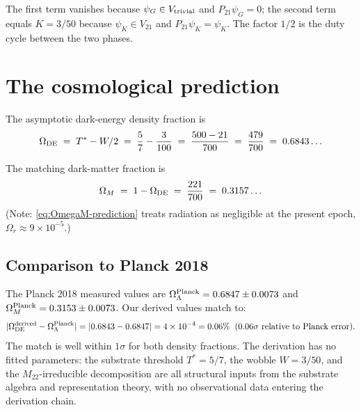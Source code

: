 \documentclass[11pt,reqno]{amsart}
\theoremstyle{plain}
\theoremstyle{definition}
\theoremstyle{remark}
\newcommand{\Mtwentytwo}{M_{22}}
\newcommand{\Vtriv}{V_{\rm trivial}}
\newcommand{\Vtwentyone}{V_{21}}
\newcommand{\Tstar}{T^*}
\newcommand{\Whalf}{W/2}
\newcommand{\OmegaDE}{\Omega_{\rm DE}}
\begin{document}
The first term vanishes because $\psi_G \in \Vtriv$ and $P_{21}\psi_G
= 0$; the second term equals $K = 3/50$ because $\psi_K \in
\Vtwentyone$ and $P_{21}\psi_K = \psi_K$. The factor $1/2$ is the duty
cycle between the two phases.

\section{The cosmological prediction}\label{sec:prediction}


The asymptotic dark-energy density fraction is
\begin{equation}\label{eq:OmegaDE-prediction}
\OmegaDE \;=\; \Tstar - \Whalf \;=\; \frac{5}{7} - \frac{3}{100}
\;=\; \frac{500 - 21}{700} \;=\; \frac{479}{700}
\;=\; 0.6843\ldots
\end{equation}

The matching dark-matter fraction is
\begin{equation}\label{eq:OmegaM-prediction}
\Omega_M \;=\; 1 - \OmegaDE \;=\; \frac{221}{700} \;=\; 0.3157\ldots
\end{equation}
(Note: \eqref{eq:OmegaM-prediction} treats radiation as negligible at
the present epoch, $\Omega_r \approx 9 \times 10^{-5}$.)

\subsection{Comparison to Planck 2018}

The Planck 2018 measured values \cite{Planck2020} are
$\Omega_\Lambda^{\rm Planck} = 0.6847 \pm 0.0073$ and
$\Omega_M^{\rm Planck} = 0.3153 \pm 0.0073$.
Our derived values match to:
\begin{equation*}
|\OmegaDE^{\rm derived} - \Omega_\Lambda^{\rm Planck}| =
|0.6843 - 0.6847| = 4 \times 10^{-4} = 0.06\%
\;\;(0.06\sigma\text{ relative to Planck error}).
\end{equation*}
The match is well within $1\sigma$ for both density fractions.
The derivation has no fitted parameters: the substrate
threshold $\Tstar = 5/7$, the wobble $W = 3/50$, and the
$\Mtwentytwo$-irreducible decomposition are all structural inputs from
the substrate algebra and representation theory, with no observational
data entering the derivation chain.
\end{document}
